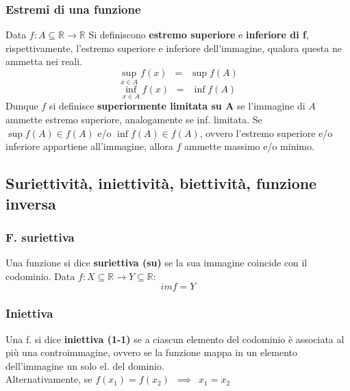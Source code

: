 \documentclass[10pt]{article}
\theoremstyle{plain}
\begin{document}
\subsubsection{Estremi di una funzione}
\begin{defin}
Data $f :  A \subseteq \mathbb{R} \rightarrow \mathbb{R}$ Si definiscono \textbf{estremo superiore} e \textbf{inferiore di f}, rispettivamente, l'estremo superiore e inferiore dell'immagine, qualora questa ne ammetta nei reali.
\[\sup \limits_{x \in A} f(x) \enspace = \enspace \sup f(A)\]
\[\inf \limits_{x \in A} f(x) \enspace = \enspace \inf f(A)\]
Dunque $f$ si definisce \textbf{superiormente limitata su A} se l'immagine di $A$ ammette estremo superiore, analogamente se inf. limitata. Se $\sup f(A) \in f(A)$ e/o $\inf f(A) \in f(A)$, ovvero l'estremo superiore e/o inferiore appartiene all'immagine, allora $f$ ammette massimo e/o minimo.
\end{defin}
\subsection{Suriettività, iniettività, biettività, funzione inversa}
\subsubsection{F. suriettiva}
\begin{defin}
Una funzione si dice \textbf{suriettiva (su)} se la sua immagine coincide con il codominio. Data $f : X \subseteq \mathbb{R} \rightarrow Y \subseteq \mathbb{R}$:
\[im f = Y\]
\end{defin}
\subsubsection{Iniettiva}
\begin{defin}
Una f. si dice \textbf{iniettiva (1-1)} se a ciascun elemento del codominio è associata al più una controimmagine, ovvero se la funzione mappa in un elemento dell'immagine un solo el. del dominio.
\\Alternativamente, se $f(x_1) = f(x_2) \enspace \implies \enspace x_1 = x_2$
\end{defin}
\end{document}
